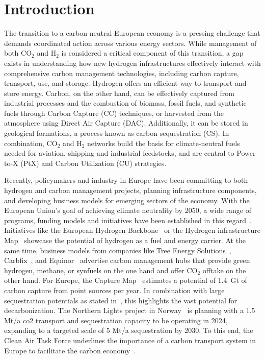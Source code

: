 \documentclass[twocolumn]{article}
\newcommand{\carbon}{CO$_2$}
\newcommand{\hydrogen}{H$_2$}
\begin{document}
\section{Introduction}

The transition to a carbon-neutral European economy is a pressing challenge that demands coordinated action across various energy sectors. While management of both \carbon{} and \hydrogen{} is considered a critical component of this transition, a gap exists in understanding how new hydrogen infrastructures effectively interact with comprehensive carbon management technologies, including carbon capture, transport, use, and storage. Hydrogen offers an efficient way to transport and store energy. Carbon, on the other hand, can be effectively captured from industrial processes and the combustion of biomass, fossil fuels, and synthetic fuels through Carbon Capture (CC) techniques, or harvested from the atmosphere using Direct Air Capture (DAC). Additionally, it can be stored in geological formations, a process known as carbon sequestration (CS). In combination, \carbon{} and \hydrogen{} networks build the basis for climate-neutral fuels needed for aviation, shipping and industrial feedstocks, and are central to Power-to-X (PtX) and Carbon Utilization (CU) strategies.

Recently, policymakers and industry in Europe have been committing to both hydrogen and carbon management projects, planning infrastructure components, and developing business models for emerging sectors of the economy. With the European Union's goal of achieving climate neutrality by 2050, a wide range of programs, funding models and initiatives have been established in this regard~\cite{eu2023netzero,europeangreendeal,europeaninnovationfund}. Initiatives like the European Hydrogen Backbone~\cite{gasforclimateEuropeanHydrogenBackbone2022} or the Hydrogen infrastructure Map~\cite{H2InfrastructureMap} showcase the potential of hydrogen as a fuel and energy carrier. At the same time, business models from companies like Tree Energy Solutions~\cite{TESHydrogenLife2023}, Carbfix~\cite{WeTurnCO2}, and Equinor~\cite{adomaitisEquinorRWEBuild2023} advertise carbon management hubs that provide green hydrogen, methane, or synfuels on the one hand and offer \carbon{} offtake on the other hand. For Europe, the Capture Map~\cite{ToolsGreenTransition} estimates a potential of 1.4~Gt of carbon capture from point sources per year. In combination with large sequestration potentials as stated in~\cite{weiProposedGlobalLayout2021}, this highlights the vast potential for decarbonization. The Northern Lights project in Norway~\cite{NorthernLightsWhat} is planning with a 1.5 Mt/a co2 transport and sequestration capacity to be operating in 2024, expanding to a targeted scale of 5 Mt/a sequestration by 2030.
To this end, the Clean Air Task Force underlines the importance of a carbon transport system in Europe to facilitate the carbon economy~\cite{lockwoodEuropeanStrategyCarbon}.
\end{document}
